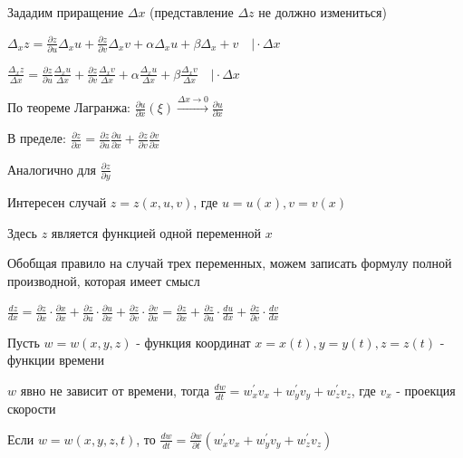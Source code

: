 \documentclass[12pt]{article}
\begin{document}
    Зададим приращение $\displaystyle \Delta x$ (представление $\displaystyle \Delta z$ не должно измениться)

    $\displaystyle \Delta_x z = \frac{\partial z}{\partial u} \Delta_x u + \frac{\partial z}{\partial v} \Delta_x v + \alpha \Delta_x u + \beta \Delta_x + v \quad \Big| \cdot \Delta x$

    $\displaystyle \frac{\Delta_x z}{\Delta x} = \frac{\partial z}{\partial u} \frac{\Delta_x u}{\Delta x} + \frac{\partial z}{\partial v} \frac{\Delta_x v}{\Delta x} + \alpha \frac{\Delta_x u}{\Delta x} + \beta \frac{\Delta_x v}{\Delta x} \quad \Big| \cdot \Delta x$

    По теореме Лагранжа: $\displaystyle \frac{\partial u}{\partial x}(\xi) \stackrel{\Delta x \to 0}{\rightarrow} \frac{\partial u}{\partial x}$

    В пределе: $\displaystyle \frac{\partial z}{\partial x} = \frac{\partial z}{\partial u} \frac{\partial u}{\partial x} + \frac{\partial z}{\partial v} \frac{\partial v}{\partial x}$

    Аналогично для $\displaystyle \frac{\partial z}{\partial y}$

    \hypertarget{completederivativeoffunctionoftwovariables}{}

    \Nota Интересен случай $\displaystyle z = z(x, u, v)$, где $\displaystyle u = u(x), v = v(x)$

    Здесь $\displaystyle z$ является функцией одной переменной $\displaystyle x$

    Обобщая правило на случай трех переменных, можем записать формулу полной производной, которая имеет смысл

    $\displaystyle \frac{dz}{dx} = \frac{\partial z}{\partial x} \cdot \frac{\partial x}{\partial x} +
    \frac{\partial z}{\partial u} \cdot \frac{\partial u}{\partial x} +
    \frac{\partial z}{\partial v} \cdot \frac{\partial v}{\partial x} =
    \frac{\partial z}{\partial x} +
    \frac{\partial z}{\partial u} \cdot \frac{du}{dx} +
    \frac{\partial z}{\partial v} \cdot \frac{dv}{dx}
    $

    \Ex Пусть $\displaystyle w = w(x, y, z)$ - функция координат $\displaystyle x = x(t), y = y(t), z = z(t)$ - функции времени

    $\displaystyle w$ явно не зависит от времени, тогда $\displaystyle \frac{dw}{dt} = w^\prime_x v_x + w^\prime_y v_y + w^\prime_z v_z$, где $\displaystyle v_x$ - проекция скорости

    Если $\displaystyle w = w(x, y, z, t)$, то $\displaystyle \frac{dw}{dt} = \frac{\partial w}{\partial t} (w^\prime_x v_x + w^\prime_y v_y + w^\prime_z v_z)$
    
\end{document}
